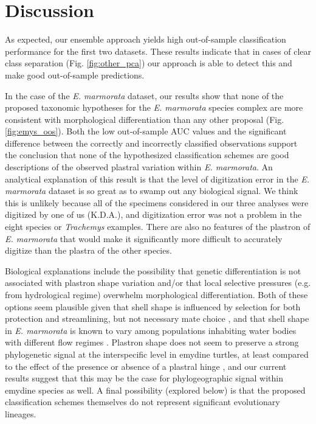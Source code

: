 \documentclass[10pt,letterpaper]{article}
\begin{document}
\section*{Discussion}


As expected, our ensemble approach yields high out-of-sample classification performance for the first two datasets. These results indicate that in cases of clear class separation (Fig. \ref{fig:other_pca}) our approach is able to detect this and make good out-of-sample predictions.

In the case of the \textit{E. marmorata} dataset, our results show that none of the proposed taxonomic hypotheses for the \textit{E. marmorata} species complex are more consistent with morphological differentiation than any other proposal (Fig. \ref{fig:emys_oos}). Both the low out-of-sample AUC values and the significant difference between the correctly and incorrectly classified observations support the conclusion that none of the hypothesized classification schemes are good descriptions of the observed plastral variation within \textit{E. marmorata}. An analytical explanation of this result is that the level of digitization error in the \textit{E. marmorata} dataset is so great as to swamp out any biological signal. We think this is unlikely because all of the specimens considered in our three analyses were digitized by one of us (K.D.A.), and digitization error was not a problem in the eight species or \textit{Trachemys} examples. There are also no features of the plastron of \textit{E. marmorata} that would make it significantly more difficult to accurately digitize than the plastra of the other species.

Biological explanations include the possibility that genetic differentiation is not associated with plastron shape variation and/or that local selective pressures (e.g. from hydrological regime) overwhelm morphological differentiation. Both of these options seem plausible given that shell shape is influenced by selection for both protection and streamlining, but not necessary mate choice \cite{Rivera2008,Rivera2011,Stayton2011,Rivera2014,Polly2016}, and that shell shape in \textit{E. marmorata} is known to vary among populations inhabiting water bodies with different flow regimes \cite{Holland1992,Lubcke2007,Germano2009}. Plastron shape does not seem to preserve a strong phylogenetic signal at the interspecific level in emydine turtles, at least compared to the effect of the presence or absence of a plastral hinge \cite{Angielczyk2011}, and our current results suggest that this may be the case for phylogeographic signal within emydine species as well. A final possibility (explored below) is that the proposed classification schemes themselves do not represent significant evolutionary lineages.
\end{document}
